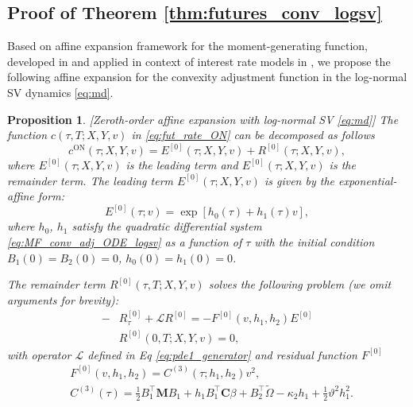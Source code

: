 \documentclass[pdftex,11pt,a4paper] {article}
\newtheorem{proposition}{Proposition}[section]
\begin{document}
\subsection{Proof of Theorem \ref{thm:futures_conv_logsv}}\label{app:futures_conv_logsv}


Based on affine expansion framework for the moment-generating function, developed in \cite{Sepp2024} and applied in context of interest rate models in \cite{SeppRakhmonov2023a}, we propose the following affine expansion for the convexity adjustment function in the log-normal SV dynamics \eqref{eq:md}.

\begin{proposition}\label{thm:convexity_ae1}[Zeroth-order affine expansion with log-normal SV \eqref{eq:md}]
The function $c(\tau,T;X,Y,v)$ in \eqref{eq:fut_rate_ON} can be decomposed as follows
\begin{equation}\label{eq:convexity_logsv_ae1}
c^{\mathrm{ON}}(\tau;X,Y,v)=E^{[0]}(\tau;X,Y,v)+R^{[0]}(\tau;X,Y,v),
\end{equation}
where $E^{[0]}(\tau;X,Y,v)$ is the leading term and $E^{[0]}(\tau;X,Y,v)$ is the remainder term.
The leading term $E^{[0]}(\tau;X,Y,v)$ is given by the exponential-affine form: 
\begin{equation}\label{eq:convexity_ae_ord1_lead_logsv}
E^{[0]}(\tau;v)=\exp\left[h_0(\tau)+h_1(\tau)v \right],
\end{equation}
where $h_0$, $h_1$ satisfy the quadratic differential system \eqref{eq:MF_conv_adj_ODE_logsv} as a function of $\tau$ with the initial condition $B_1(0)=B_2(0)=0$, $h_0(0)=h_1(0)=0$.

The remainder term $R^{[0]}(\tau,T;X,Y,v)$ solves the following problem (we omit arguments for brevity):  
\begin{equation}\label{eq:MF_conv_adj_Rem1}
\begin{split}
-&R^{[0]}_\tau + \mathcal{L}R^{[0]}=-F^{[0]}(v,h_1,h_2) E^{[0]}\\
&R^{[0]}(0,T;X,Y,v)=0,
\end{split}
\end{equation}
with operator $\mathcal{L}$ defined in Eq \eqref{eq:pde1_generator} and residual function $F^{[0]}$
\begin{equation}\label{eq:MF_conv_adj_Rem2}
\begin{split}
& F^{[0]}(v,h_1,h_2)=C^{(3)}(\tau; h_1,h_2) v^2,\\
& C^{(3)}(\tau) = \frac{1}{2}B_1^\top\mathbf{M}B_1 + h_1B_1^\top\mathbf{C}\beta + B_2^\top\tilde\Omega - \kappa_2h_1 + \frac{1}{2}\vartheta^2h_1^2.
\end{split}
\end{equation}


\end{proposition}
\end{document}
